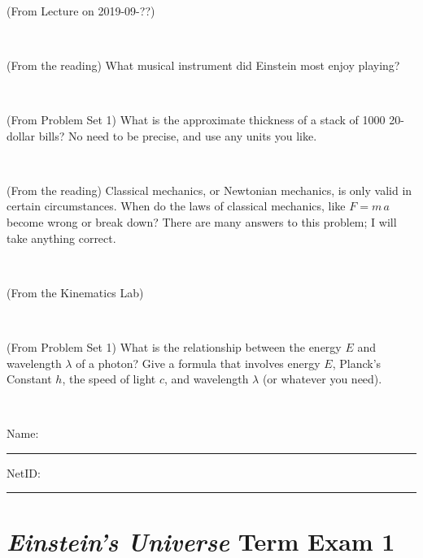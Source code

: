 \documentclass[12pt, letterpaper]{article}
\begin{document}
\vfill ~

\begin{problem} (From Lecture on 2019-09-??)
\end{problem}


\vfill ~

\begin{problem} (From the reading)
What musical instrument did Einstein most enjoy playing?
\end{problem}


\vfill ~


\clearpage


\begin{problem} (From Problem Set 1)
What is the approximate thickness of a stack of 1000 20-dollar bills?
No need to be precise, and use any units you like.
\end{problem}


\vfill ~

\begin{problem} (From the reading)
Classical mechanics, or Newtonian mechanics, is only valid in certain
circumstances. When do the laws of classical mechanics, like $F =
m\,a$ become wrong or break down? There are many answers to this
problem; I will take anything correct.
\end{problem}


\vfill ~

\begin{problem} (From the Kinematics Lab)

\end{problem}


\vfill ~

\begin{problem} (From Problem Set 1)
What is the relationship between the energy $E$ and wavelength
$\lambda$ of a photon? Give a formula that involves energy $E$,
Planck's Constant $h$, the speed of light $c$, and wavelength
$\lambda$ (or whatever you need).
\end{problem}

\vfill ~


\cleardoublepage



\noindent
Name: \rule[-1ex]{0.60\textwidth}{0.1pt}
NetID: \rule[-1ex]{0.20\textwidth}{0.1pt}

\section*{\textsl{Einstein's Universe} Term Exam 1}
\setcounter{problem}{1}
\end{document}
